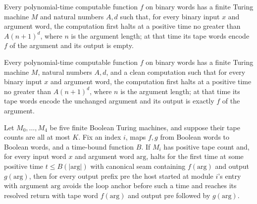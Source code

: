 \begin{lemma}
\label{Complexity.clA5Clean_install}
\leanok
{}
Every polynomial-time computable function $f$ on binary words has a finite Turing
machine $M$ and natural numbers $A,d$ such that, for every binary input $x$ and argument
word, the computation first halts at a positive time no greater than $A(n+1)^d$, where
$n$ is the argument length; at that time its tape words encode $f$ of the argument and
its output is empty.
\end{lemma}

\begin{lemma}
\label{Complexity.clA5Clean_emit}
\leanok
{}
Every polynomial-time computable function $f$ on binary words has a finite Turing
machine $M$, natural numbers $A,d$, and a clean computation such that for every binary
input $x$ and argument word, the computation first halts at a positive time no greater
than $A(n+1)^d$, where $n$ is the argument length; at that time its tape words encode
the unchanged argument and its output is exactly $f$ of the argument.
\end{lemma}

\begin{lemma}
\label{Complexity.clA5Host_clean}
\leanok
{}
Let $M_0,\ldots,M_4$ be five finite Boolean Turing machines, and suppose their tape
counts are all at most $K$. Fix an index $i$, maps $f,g$ from Boolean words to Boolean
words, and a time-bound function $B$. If $M_i$ has positive tape count and, for every
input word $x$ and argument word $\mathrm{arg}$, halts for the first time at some
positive time $t\le B(|\mathrm{arg}|)$ with canonical seam containing $f(\mathrm{arg})$
and output $g(\mathrm{arg})$, then for every output prefix $\mathrm{pre}$ the host
started at module $i$'s entry with argument $\mathrm{arg}$ avoids the loop anchor before
such a time and reaches its resolved return with tape word $f(\mathrm{arg})$ and output
$\mathrm{pre}$ followed by $g(\mathrm{arg})$.
\end{lemma}

